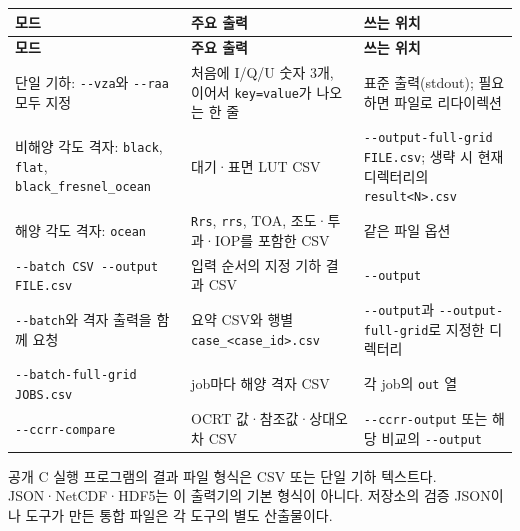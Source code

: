 {\TableFont
\begin{longtable}{@{}>{\raggedright\arraybackslash}p{}>{\raggedright\arraybackslash}p{}>{\raggedright\arraybackslash}p{}@{}}
\toprule
\textbf{모드} & \textbf{주요 출력} & \textbf{쓰는 위치} \\
\midrule
\endfirsthead
\toprule
\textbf{모드} & \textbf{주요 출력} & \textbf{쓰는 위치} \\
\midrule
\endhead
\bottomrule
\endfoot
단일 기하: \texttt{-\allowbreak{}-\allowbreak{}vza}와 \texttt{-\allowbreak{}-\allowbreak{}raa} 모두 지정 & 처음에 I/Q/U 숫자 3개, 이어서 \texttt{key=\allowbreak{}value}가 나오는 한 줄 & 표준 출력(stdout); 필요하면 파일로 리다이렉션 \\
비해양 각도 격자: \texttt{black}, \texttt{flat}, \texttt{black\_\allowbreak{}fresnel\_\allowbreak{}ocean} & 대기·표면 LUT CSV & \texttt{-\allowbreak{}-\allowbreak{}output-\allowbreak{}full-\allowbreak{}grid FILE.\allowbreak{}csv}; 생략 시 현재 디렉터리의 \texttt{result<N>.\allowbreak{}csv} \\
해양 각도 격자: \texttt{ocean} & \texttt{Rrs}, \texttt{rrs}, TOA, 조도·투과·IOP를 포함한 CSV & 같은 파일 옵션 \\
\texttt{-\allowbreak{}-\allowbreak{}batch CSV -\allowbreak{}-\allowbreak{}output FILE.\allowbreak{}csv} & 입력 순서의 지정 기하 결과 CSV & \texttt{-\allowbreak{}-\allowbreak{}output} \\
\texttt{-\allowbreak{}-\allowbreak{}batch}와 격자 출력을 함께 요청 & 요약 CSV와 행별 \texttt{case\_\allowbreak{}<case\_\allowbreak{}id>.\allowbreak{}csv} & \texttt{-\allowbreak{}-\allowbreak{}output}과 \texttt{-\allowbreak{}-\allowbreak{}output-\allowbreak{}full-\allowbreak{}grid}로 지정한 디렉터리 \\
\texttt{-\allowbreak{}-\allowbreak{}batch-\allowbreak{}full-\allowbreak{}grid JOBS.\allowbreak{}csv} & job마다 해양 격자 CSV & 각 job의 \texttt{out} 열 \\
\texttt{-\allowbreak{}-\allowbreak{}ccrr-\allowbreak{}compare} & OCRT 값·참조값·상대오차 CSV & \texttt{-\allowbreak{}-\allowbreak{}ccrr-\allowbreak{}output} 또는 해당 비교의 \texttt{-\allowbreak{}-\allowbreak{}output} \\
\end{longtable}
}

공개 C 실행 프로그램의 결과 파일 형식은 CSV 또는 단일 기하 텍스트다. JSON·NetCDF·HDF5는 이 출력기의 기본 형식이 아니다. 저장소의 검증 JSON이나 도구가 만든 통합 파일은 각 도구의 별도 산출물이다.

